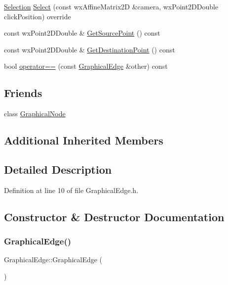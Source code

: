 \begin{DoxyCompactItemize}
\item 
\hyperlink{struct_selection}{Selection} \hyperlink{class_graphical_edge_aa2dbc33d5177ce3aad84f39ba97921de}{Select} (const wx\+Affine\+Matrix2D \&camera, wx\+Point2\+D\+Double click\+Position) override
\item 
const wx\+Point2\+D\+Double \& \hyperlink{class_graphical_edge_af8738fa9de63d51bec94fae3bebbe4ac}{Get\+Source\+Point} () const
\item 
const wx\+Point2\+D\+Double \& \hyperlink{class_graphical_edge_aaf19f4b4688b5eb5df39be7af1d09b4b}{Get\+Destination\+Point} () const
\item 
bool \hyperlink{class_graphical_edge_aa03597dca35cc2f08c8a1894657546d8}{operator==} (const \hyperlink{class_graphical_edge}{Graphical\+Edge} \&other) const
\end{DoxyCompactItemize}
\subsection*{Friends}
\begin{DoxyCompactItemize}
\item 
class \hyperlink{class_graphical_edge_adc7790177f80355fce81568dcdbf561e}{Graphical\+Node}
\end{DoxyCompactItemize}
\subsection*{Additional Inherited Members}


\subsection{Detailed Description}


Definition at line 10 of file Graphical\+Edge.\+h.



\subsection{Constructor \& Destructor Documentation}
\mbox{\label{class_graphical_edge_a9325712366dcec2f70457f66b19bb04d}} 
\subsubsection{\texorpdfstring{Graphical\+Edge()}{GraphicalEdge()}\hspace{0.1cm}{\footnotesize\ttfamily [1/4]}}
{\footnotesize\ttfamily Graphical\+Edge\+::\+Graphical\+Edge (\begin{DoxyParamCaption}{ }\end{DoxyParamCaption})}



